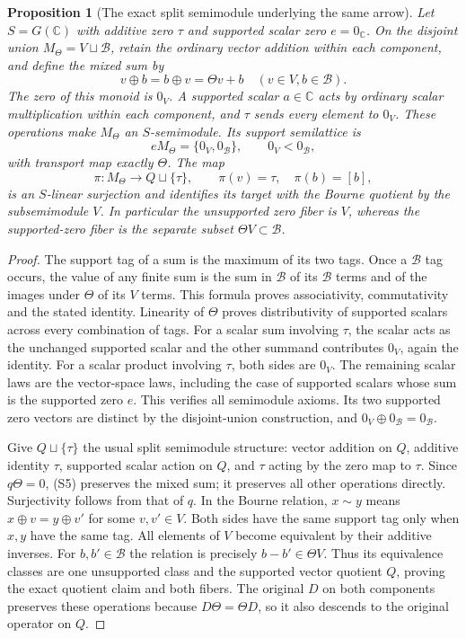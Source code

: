\documentclass[11pt]{article}
\newtheorem{proposition}[theorem]{Proposition}
\newcommand{\C}{\mathbb C}\newcommand{\R}{\mathbb R}
\newcommand{\B}{\mathscr B}\newcommand{\M}{\mathcal M}
\begin{document}
\begin{proposition}[The exact split semimodule underlying the same arrow]
Let $S=G(\C)$ with additive zero $\tau$ and supported scalar zero
$e=0_\C$. On the disjoint union
$M_\Theta=V\sqcup\B$, retain the ordinary vector addition within
each component, and define the mixed sum by
\[
 v\oplus b=b\oplus v=\Theta v+b\quad(v\in V,b\in\B).
\]
The zero of this monoid is $0_V$. A supported scalar $a\in\C$
acts by ordinary scalar multiplication within each component, and
$\tau$ sends every element to $0_V$. These operations make
$M_\Theta$ an $S$-semimodule. Its support semilattice is
\[
 eM_\Theta=\{0_V,0_\B\},\qquad0_V<0_\B,
\]
with transport map exactly $\Theta$. The map
\[
 \pi:M_\Theta\longrightarrow Q\sqcup\{\tau\},\qquad
 \pi(v)=\tau,\quad\pi(b)=[b],
 \tag{S5}
\]
is an $S$-linear surjection and identifies its target with the Bourne
quotient by the subsemimodule $V$. In particular the unsupported
zero fiber is $V$, whereas the supported-zero fiber is the separate
subset $\Theta V\subset\B$.
\end{proposition}
\begin{proof}
The support tag of a sum is the maximum of its two tags. Once a
$\B$ tag occurs, the value of any finite sum is the sum in $\B$
of its $\B$ terms and of the images under $\Theta$ of its $V$
terms. This formula proves associativity, commutativity and the
stated identity. Linearity of $\Theta$ proves distributivity of
supported scalars across every combination of tags. For a scalar
sum involving $\tau$, the scalar acts as the unchanged supported
scalar and the other summand contributes $0_V$, again the identity.
For a scalar product involving $\tau$, both sides are $0_V$.
The remaining scalar laws are the vector-space laws, including
the case of supported scalars whose sum is the supported zero $e$.
This verifies all semimodule axioms. Its two supported zero vectors
are distinct by the disjoint-union construction, and
$0_V\oplus0_\B=0_\B$.

Give $Q\sqcup\{\tau\}$ the usual split semimodule structure:
vector addition on $Q$, additive identity $\tau$, supported scalar
action on $Q$, and $\tau$ acting by the zero map to $\tau$.
Since $q\Theta=0$, (S5) preserves the mixed sum; it preserves all
other operations directly. Surjectivity follows from that of $q$.
In the Bourne relation, $x\sim y$ means
$x\oplus v=y\oplus v'$ for some $v,v'\in V$.
Both sides have the same support tag only when $x,y$ have the same
tag. All elements of $V$ become equivalent by their additive
inverses. For $b,b'\in\B$ the relation is precisely
$b-b'\in\Theta V$. Thus its equivalence classes are one unsupported
class and the supported vector quotient $Q$, proving the exact
quotient claim and both fibers. The original $D$ on both components
preserves these operations because $D\Theta=\Theta D$, so it also
descends to the original operator on $Q$.
\end{proof}
\end{document}

